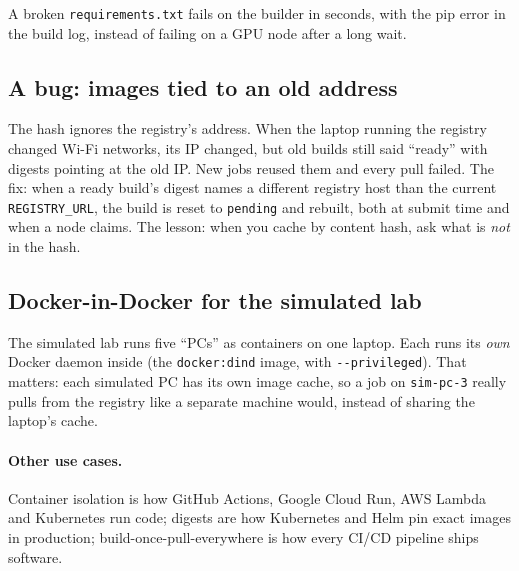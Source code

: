 A broken \texttt{requirements.txt} fails on the builder in seconds, with the pip
error in the build log, instead of failing on a GPU node after a long wait.

\subsection{A bug: images tied to an old address}

The hash ignores the registry's address. When the laptop running the registry
changed Wi-Fi networks, its IP changed, but old builds still said ``ready'' with
digests pointing at the old IP. New jobs reused them and every pull failed. The
fix: when a ready build's digest names a different registry host than the
current \texttt{REGISTRY\_URL}, the build is reset to \texttt{pending} and
rebuilt, both at submit time and when a node claims. The lesson: when you cache
by content hash, ask what is \emph{not} in the hash.

\subsection{Docker-in-Docker for the simulated lab}

The simulated lab runs five ``PCs'' as containers on one laptop. Each runs its
\emph{own} Docker daemon inside (the \texttt{docker:dind} image, with
\verb|--privileged|). That matters: each simulated PC has its own image cache,
so a job on \texttt{sim-pc-3} really pulls from the registry like a separate
machine would, instead of sharing the laptop's cache.

\paragraph{Other use cases.} Container isolation is how GitHub Actions,
Google Cloud Run, AWS Lambda and Kubernetes run code; digests are how
Kubernetes and Helm pin exact images in production; build-once-pull-everywhere
is how every CI/CD pipeline ships software.
